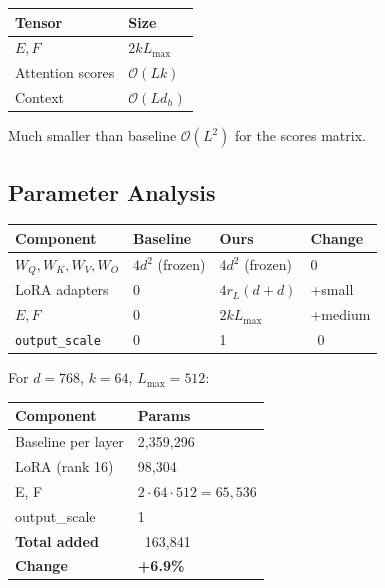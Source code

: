 \begin{table}[H]
\centering
\small
\begin{tabular}{ll}
\toprule
\textbf{Tensor} & \textbf{Size} \\
\midrule
$E, F$ & $2 k L_\text{max}$ \\
Attention scores & $\mathcal{O}(L k)$ \\
Context & $\mathcal{O}(L d_h)$ \\
\bottomrule
\end{tabular}
\end{table}

Much smaller than baseline $\mathcal{O}(L^2)$ for the scores matrix.

\subsection{Parameter Analysis}

\begin{table}[H]
\centering
\small
\begin{tabular}{llll}
\toprule
\textbf{Component} & \textbf{Baseline} & \textbf{Ours} & \textbf{Change} \\
\midrule
$W_Q, W_K, W_V, W_O$ & $4 d^2$ (frozen) & $4 d^2$ (frozen) & 0 \\
LoRA adapters & 0 & $4 r_L (d + d)$ & +small \\
$E, F$ & 0 & $2 k L_\text{max}$ & +medium \\
\texttt{output\_scale} & 0 & 1 & ~0 \\
\bottomrule
\end{tabular}
\end{table}

For $d = 768$, $k = 64$, $L_\text{max} = 512$:

\begin{table}[H]
\centering
\small
\begin{tabular}{ll}
\toprule
\textbf{Component} & \textbf{Params} \\
\midrule
Baseline per layer & 2,359,296 \\
LoRA (rank 16) & 98,304 \\
E, F & $2 \cdot 64 \cdot 512 = 65,536$ \\
output\_scale & 1 \\
\textbf{Total added} & ~163,841 \\
\textbf{Change} & \textbf{+6.9\%} \\
\bottomrule
\end{tabular}
\end{table}

